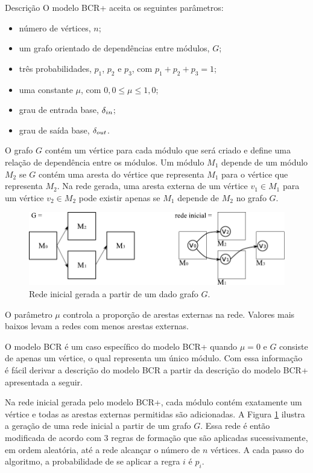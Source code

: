 \begin{section}{Descrição}
	O modelo BCR+ aceita os seguintes parâmetros:

	\begin{itemize}
	\item número de vértices, $n$;
	\item um grafo orientado de dependências entre módulos, $G$;
	\item três probabilidades, $p_1$, $p_2$ e $p_3$, com $p_1 + p_2 + p_3 = 1$;
	\item uma constante $\mu$, com $0,0 \le \mu \le 1,0$;
	\item grau de entrada base, $\delta_{in}$;
	\item grau de saída base, $\delta_{out}$.
	\end{itemize}

	O grafo $G$ contém um vértice para cada módulo que será criado e define uma relação de dependência entre os módulos. Um módulo $M_1$ depende de um módulo $M_2$ se $G$ contém uma aresta do vértice que representa $M_1$ para o vértice que representa $M_2$. Na rede gerada, uma aresta externa de um vértice $v_1 \in M_1$ para um vértice $v_2 \in M_2$ pode existir apenas se $M_1$ depende de $M_2$ no grafo $G$. %

	\begin{figure}[htbp]
		\centering
			\includegraphics[scale=1]{figuras/exemplo-bcr-g}
		\caption{Rede inicial gerada a partir de um dado grafo $G$.}
		\label{fig:bcr-g}
	\end{figure}

	O parâmetro $\mu$ controla a proporção de arestas externas na rede. Valores mais baixos levam a redes com menos arestas externas.

	O modelo BCR é um caso específico do modelo BCR+ quando $\mu = 0$ e $G$ consiste de apenas um vértice, o qual representa um único módulo. Com essa informação é fácil derivar a descrição do modelo BCR a partir da descrição do modelo BCR+ apresentada a seguir.
	
	Na rede inicial gerada pelo modelo BCR+, cada módulo contém exatamente um vértice e todas as arestas externas permitidas são adicionadas. A Figura \ref{fig:bcr-g} ilustra a geração de uma rede inicial a partir de um grafo $G$. Essa rede é então modificada de acordo com 3 regras de formação que são aplicadas sucessivamente, em ordem aleatória, até a rede alcançar o número de $n$ vértices. A cada passo do algoritmo, a probabilidade de se aplicar a regra $i$ é $p_i$.
	
\end{section}

